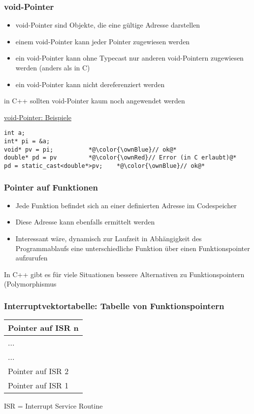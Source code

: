 \subsubsection{void-Pointer\hfill}
\label{sec:void-Pointer}
\begin{itemize}
	\item void-Pointer sind Objekte, die eine gültige Adresse darstellen
	\item einem void-Pointer kann jeder Pointer zugewiesen werden
	\item \Large{ein void-Pointer kann ohne Typecast nur anderen void-Pointern zugewiesen werden (anders als in C)}\normalsize
	\item ein void-Pointer kann nicht dereferenziert werden
\end{itemize}
\begin{hinweis}
in C++ sollten void-Pointer kaum noch angewendet werden
\end{hinweis}
\underline{void-Pointer: Beispiele}\\
\noindent
\begin{minipage}{\linewidth}
\begin{lstlisting}
int a;
int* pi = &a;
void* pv = pi;			*@\color{\ownBlue}// ok@*
double* pd = pv			*@\color{\ownRed}// Error (in C erlaubt)@*
pd = static_cast<double*>pv;	*@\color{\ownBlue}// ok@*
\end{lstlisting}
\end{minipage}

\subsubsection{Pointer auf Funktionen\hfill}
\label{sec:Pointer auf Funktionen}
\begin{itemize}
	\item Jede Funktion befindet sich an einer definierten Adresse im Codespeicher
	\item Diese Adresse kann ebenfalls ermittelt werden
	\item Interessant wäre, dynamisch zur Laufzeit in Abhängigkeit des Programmablaufs eine unterschiedliche Funktion über einen Funktionspointer aufzurufen
\end{itemize}
\begin{hinweis}
In C++ gibt es für viele Situationen bessere Alternativen zu Funktionspointern (Polymorphismus
\end{hinweis}

\subsubsection{Interruptvektortabelle: Tabelle von Funktionspointern\hfill}
\label{sec:Interruptvektortabelle: Tabelle von Funktionspointern}
\centering
\begin{tabularx}{0.25\textwidth}{|X|}
	\hline
	Pointer auf ISR n\\
	\hline
	...\\
	\hline
	...\\
	\hline
	Pointer auf ISR 2\\
	\hline
	Pointer auf ISR 1\\
	\hline
\end{tabularx}
\flushleft
ISR = Interrupt Service Routine

